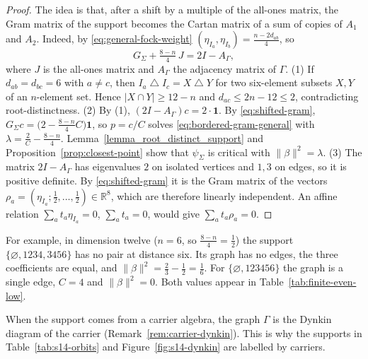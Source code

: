 \documentclass{article}
\theoremstyle{definition}
\theoremstyle{remark}
\newcommand{\vac}{|\Omega\rangle}
\newcommand{\R}{\mathbb R}
\newcommand{\ket}[1]{\lvert #1\rangle}
\newcommand{\norm}[1]{\lVert #1\rVert}
\newcommand{\symdiff}{\mathbin{\triangle}}
\begin{document}
\begin{proof}
The idea is that, after a shift by a multiple of the all-ones matrix, the Gram
matrix of the support becomes the Cartan matrix of a sum of copies of $A_1$
and $A_2$. Indeed, by \eqref{eq:general-fock-weight}
$(\eta_{I_a},\eta_{I_b})=\frac{n-2d_{ab}}4$, so
\begin{equation}
 G_\Sigma+\tfrac{8-n}4\,J=2I-A_\Gamma ,
 \label{eq:shifted-gram}
\end{equation}
where $J$ is the all-ones matrix and $A_\Gamma$ the adjacency matrix of
$\Gamma$.
(1) If $d_{ab}=d_{bc}=6$ with $a\ne c$, then
$I_a\symdiff I_c=X\symdiff Y$ for two six-element subsets $X,Y$ of an
$n$-element set. Hence $\lvert X\cap Y\rvert\ge12-n$ and
$d_{ac}\le2n-12\le2$, contradicting root-distinctness.
(2) By (1), $(2I-A_\Gamma)c=2\cdot\mathbf 1$. By \eqref{eq:shifted-gram},
$G_\Sigma c=\bigl(2-\frac{8-n}4C\bigr)\mathbf 1$, so $p=c/C$ solves
\eqref{eq:bordered-gram-general} with $\lambda=\frac2C-\frac{8-n}4$.
Lemma~\ref{lemma_root_distinct_support} and
Proposition~\ref{prop:closest-point} show that $\psi_\Sigma$ is critical with
$\norm\beta^2=\lambda$.
(3) The matrix $2I-A_\Gamma$ has eigenvalues $2$ on isolated vertices and
$1,3$ on edges, so it is positive definite. By \eqref{eq:shifted-gram} it is
the Gram matrix of the vectors
$\rho_a=(\eta_{I_a};\frac12,\ldots,\frac12)\in\R^8$, which are therefore
linearly independent. An affine relation $\sum_at_a\eta_{I_a}=0$,
$\sum_at_a=0$, would give $\sum_at_a\rho_a=0$.
\end{proof}

For example, in dimension twelve ($n=6$, so $\frac{8-n}4=\frac12$) the support
$\{\varnothing,1234,3456\}$ has no pair at distance six. Its graph has no
edges, the three coefficients are equal, and
$\norm\beta^2=\frac23-\frac12=\frac16$. For $\{\varnothing,123456\}$ the graph
is a single edge, $C=4$ and $\norm\beta^2=0$. Both values appear in
Table~\ref{tab:finite-even-low}.

When the support comes from a carrier algebra, the graph $\Gamma$ is the Dynkin
diagram of the carrier (Remark~\ref{rem:carrier-dynkin}). This is why the
supports in Table~\ref{tab:s14-orbits} and Figure~\ref{fig:s14-dynkin} are
labelled by carriers.

\end{document}
